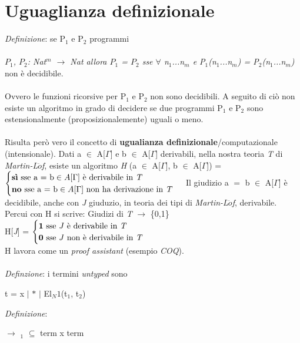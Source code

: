 \documentclass[10pt,a4paper, italian]{book}
\begin{document}
{{\section{Uguaglianza definizionale}
\label{sec: uguaglianza-definizionale}
\textit{Definizione}: se P$_1$ e P$_2$ programmi\\\\
\textit{$P_1$, $P_2$: Nat$^m$  $\rightarrow$ Nat \quad allora \quad
$P_1$ = $P_2$ sse $\forall$ n$_1$...n$_m$ e P$_1$(n$_1$...n$_m$) = P$_2$(n$_1$...n$_m$)} non \`e decidibile.\\\\
Ovvero le funzioni ricorsive per P$_1$ e P$_2$ non sono decidibili. A seguito di ci\`o non esiste un algoritmo in grado di decidere se due programmi P$_1$ e P$_2$ sono estensionalmente (proposizionalemente) uguali o meno.\\\\
Risulta per\`o vero il concetto di \textbf{ugualianza definizionale}/computazionale (intensionale). Dati a $\in$ A[$\Gamma$] e b $\in$ A[$\Gamma$] derivabili, nella nostra teoria \textit{T} di \textit{Martin-L$\ddot{o}$f}, esiste un algoritmo \textit{H} (a $\in$ A[$\Gamma$], b $\in$ A[$\Gamma$]) =
$
\begin{cases}
\text{\textbf{sì} sse a = b} \in A[\Gamma]  \text{ è derivabile in \textit{T}} \\
\text{\textbf{no} sse a = b} \in A[\Gamma] \text{ non ha derivazione in \textit{T}}
\end{cases}
$
Il giudizio a $=$ b $\in$ A[$\Gamma$] \`e decidibile, anche con \textit{J} giuduzio, in teoria dei tipi di \textit{Martin-L$\ddot{o}$f}, derivabile. Percui con H si scrive: Giudizi di \textit{T} $\rightarrow$ \{0,1\}\\
H[\textit{J}] =
$
\begin{cases}
\textbf{1} \text{ sse \textit{J} è derivabile in \textit{T}}  \\
\textbf{0} \text{ sse \textit{J} non è derivabile in \textit{T}}
\end{cases}
$
\\
H lavora come un \textit{proof assistant} (esempio \textit{COQ}).\\\\
\noindent
\textit{Definzione}: i termini \textit{untyped} sono
\begin{center}t = x $|$ $\ast$ $|$ El$_N1$(t$_1$, t$_2$)\end{center}
\textit{Definizione}: \begin{center}$\rightarrow$ $_1$ $\subseteq$ term x term\end{center}
}}
\end{document}
